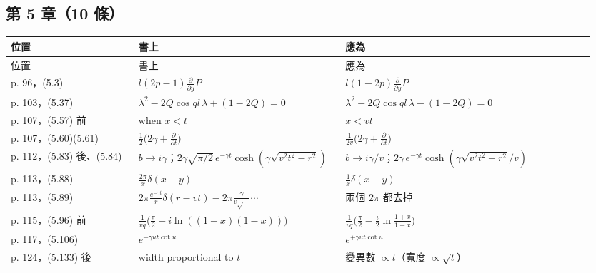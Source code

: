 \subsection{第 5 章（10 條）}
{\footnotesize\renewcommand{\arraystretch}{1.1}\setlength{\tabcolsep}{4pt}
\begin{longtable}{@{}>{\raggedright\arraybackslash}p{0.21\linewidth}>{\raggedright\arraybackslash}p{0.34\linewidth}>{\raggedright\arraybackslash}p{0.41\linewidth}@{}}
\toprule 位置 & 書上 & 應為\\ \midrule\endfirsthead
\toprule 位置 & 書上 & 應為\\ \midrule\endhead
\bottomrule\endfoot
p. 96，(5.3) & $l(2p-1)\frac{\partial}{\partial y}P$ & $l(1-2p)\frac{\partial}{\partial y}P$\\
p. 103，(5.37) & $\lambda^2-2Q\cos ql\,\lambda+(1-2Q)=0$ & $\lambda^2-2Q\cos ql\,\lambda-(1-2Q)=0$\\
p. 107，(5.57) 前 & when $x<t$ & $x<vt$\\
p. 107，(5.60)(5.61) & $\frac12\big(2\gamma+\frac{\partial}{\partial t}\big)$ & $\frac{1}{2v}\big(2\gamma+\frac{\partial}{\partial t}\big)$\\
p. 112，(5.83) 後、(5.84) & $b\to i\gamma$；$2\gamma\sqrt{\pi/2}\,e^{-\gamma t}\cosh(\gamma\sqrt{v^2t^2-r^2})$ & $b\to i\gamma/v$；$2\gamma\,e^{-\gamma t}\cosh(\gamma\sqrt{v^2t^2-r^2}/v)$\\
p. 113，(5.88) & $\frac{2\pi}{x}\delta(x-y)$ & $\frac1x\delta(x-y)$\\
p. 113，(5.89) & $2\pi\frac{e^{-\gamma t}}r\delta(r-vt)-2\pi\frac{\gamma}{v\sqrt{\cdots}}\cdots$ & 兩個 $2\pi$ 都去掉\\
p. 115，(5.96) 前 & $\frac1{vq}\big(\frac\pi2-i\ln((1+x)(1-x))\big)$ & $\frac1{vq}\big(\frac\pi2-\frac i2\ln\frac{1+x}{1-x}\big)$\\
p. 117，(5.106) & $e^{-\gamma ut\cot u}$ & $e^{+\gamma ut\cot u}$\\
p. 124，(5.133) 後 & width proportional to $t$ & 變異數 $\propto t$（寬度 $\propto\sqrt t$）\\
\end{longtable}}

